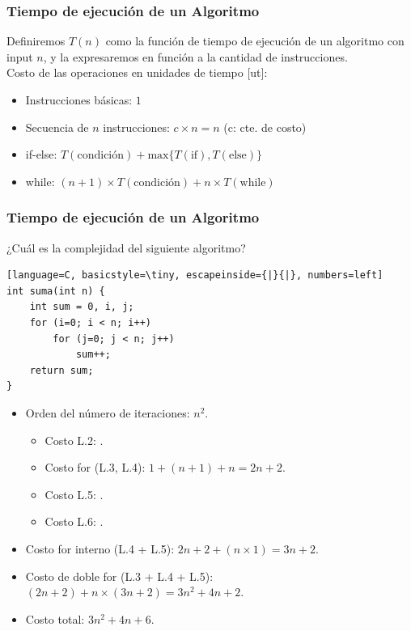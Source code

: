 \documentclass{beamer}
\begin{document}
\begin{frame}[fragile]
 \frametitle{Tiempo de ejecución de un Algoritmo}
\small Definiremos $T(n)$ como la función de tiempo de ejecución de un algoritmo con input $n$, y la expresaremos en función a la cantidad de instrucciones.\\
\bigskip
Costo de las operaciones en unidades de tiempo [ut]:
\begin{itemize}
\item Instrucciones básicas: $1$
\item Secuencia de $n$ instrucciones:  $c \times n = n$ (c: cte. de costo)
\item if-else: $T(\text{condición}) + \text{max}\{T(\text{if}), T(\text{else})\}$
\item while: $(n+1) \times T(\text{condición}) + n \times T(\text{while}) $
\end{itemize}
\end{frame}


\begin{frame}[fragile]
 \frametitle{Tiempo de ejecución de un Algoritmo}
\begin{exampleblock}{¿Cuál es la complejidad del siguiente algoritmo?}
\begin{lstlisting}[language=C, basicstyle=\tiny, escapeinside={|}{|}, numbers=left]
int suma(int n) {
	int sum = 0, i, j;
	for (i=0; i < n; i++) 
		for (j=0; j < n; j++)
			sum++;
	return sum;
}
\end{lstlisting}
\end{exampleblock}
\pause
\begin{itemize}
\item Orden del número de iteraciones: $n^2$. \pause
\begin{itemize}
\item Costo L.2: . \pause 
\item Costo for (L.3, L.4): \pause $1+(n+1)+n = 2n+2$. \pause
\item Costo L.5: . \pause
\item Costo L.6: . \pause
\end{itemize}
\item Costo for interno (L.4 + L.5):  \pause $2n+2+ (n \times 1) = 3n+2$. \pause
\item Costo de doble for (L.3 + L.4 + L.5): \pause $(2n+2) + n \times (3n+2) = 3n^2 + 4n + 2$. \pause
\item Costo total: \pause $3n^2 + 4n + 6$.
\end{itemize}

\end{frame}
\end{document}
